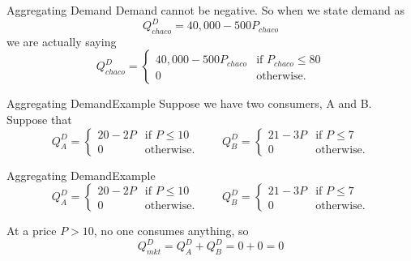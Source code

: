 \documentclass[12pt,t]{beamer}
\begin{document}
\begin{frame}{Aggregating Demand}
  Demand cannot be negative. So when we state demand as
  $$
    Q^D_{chaco} = 40,000  - 500P_{chaco}
  $$
  we are actually saying
  $$
    Q^D_{chaco} =
    \begin{cases}
      40,000  - 500P_{chaco} & \text{if } P_{chaco} \leq 80 \\
      0                      & \text{otherwise}.
    \end{cases}
  $$
\end{frame}

\begin{frame}{Aggregating Demand}{Example}
  Suppose we have two consumers, A and B. Suppose that
  $$
    Q_A^D =
    \begin{cases}
      20 - 2P & \text{if } P \leq 10 \\
      0       & \text{otherwise}.
    \end{cases}
    \quad\quad
    Q_B^D =
    \begin{cases}
      21 - 3P & \text{if } P  \leq 7 \\
      0       & \text{otherwise}.
    \end{cases}
  $$

  \bigskip
\end{frame}

\begin{frame}{Aggregating Demand}{Example}
  $$
    Q_A^D =
    \begin{cases}
      20 - 2P & \text{if } P \leq 10 \\
      0       & \text{otherwise}.
    \end{cases}
    \quad\quad
    Q_B^D =
    \begin{cases}
      21 - 3P & \text{if } P  \leq 7 \\
      0       & \text{otherwise}.
    \end{cases}
  $$

  \vspace{10mm}


   {
    At a price $P > 10$, no one consumes anything, so 
    $$Q^D_{mkt} = Q_A^D + Q_B^D = 0 + 0 = 0$$ 
  }
\end{frame}
\end{document}
